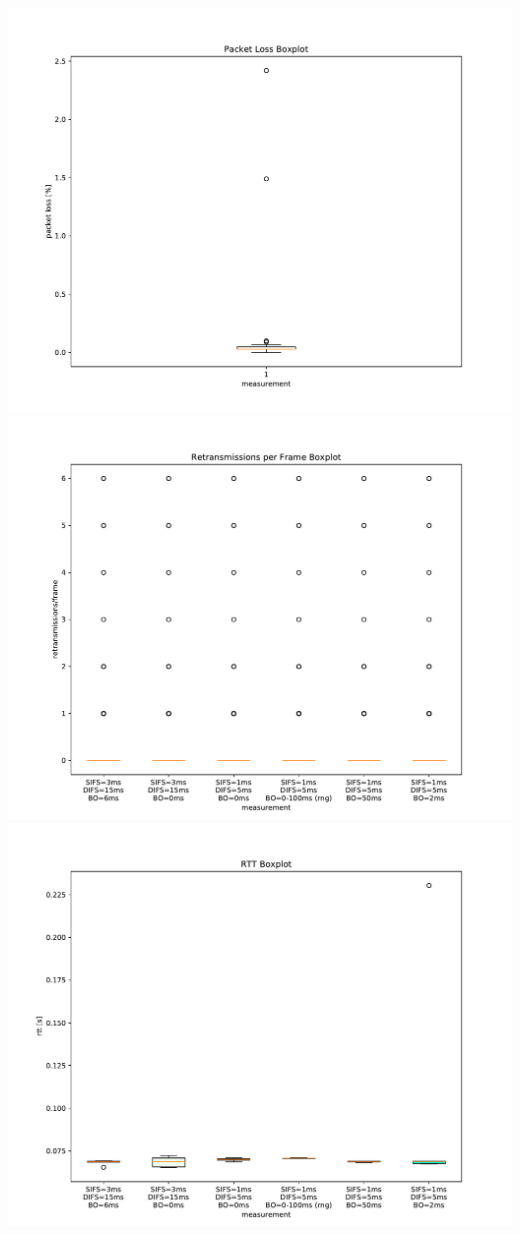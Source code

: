\documentclass{article}
\begin{document}
	\includegraphics[width=\textwidth]{boxplot/packet_loss_boxplot}
	\includegraphics[width=\textwidth]{boxplot/retransmissions_per_frame_boxplot}
	\includegraphics[width=\textwidth]{boxplot/rtt_boxplot}
\end{document}
